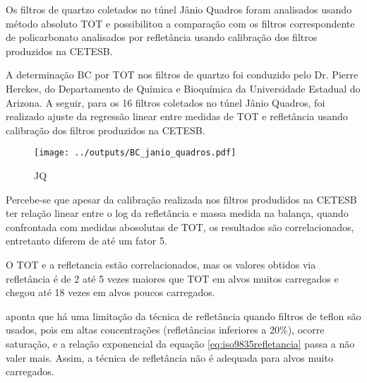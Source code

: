 Os filtros de quartzo coletados no túnel Jânio Quadros foram analisados usando
método absoluto TOT e possibilitou a comparação com os filtros correspondente 
de policarbonato analisados por refletância usando calibração dos filtros
produzidos na CETESB. 

A determinação BC por TOT nos filtros de quartzo foi conduzido pelo 
Dr. Pierre Herckes, do Departamento de Química e Bioquímica da 
Universidade Estadual do Arizona. A seguir, para os 16 filtros coletados no 
túnel Jânio Quadros, foi realizado ajuste da regressão linear
entre medidas de TOT e refletância usando calibração dos filtros produzidos na 
CETESB.

\begin{figure}
  \centering
  \begin{minipage}[b]{0.5\linewidth}
    \texttt{[image: ../outputs/BC\_janio\_quadros.pdf]}
    \caption{JQ}
  \end{minipage}%
  \hspace{0.5cm}
  \begin{minipage}[b]{0.45\linewidth}
    \begin{small}
      
    \end{small}
  \end{minipage}
\end{figure}

Percebe-se que apesar da calibração realizada nos filtros produdidos na CETESB
ter relação linear entre o log da refletância e massa medida na balança, quando
confrontada com medidas abosolutas de TOT, os resultados são correlacionados, 
entretanto diferem de até um fator 5. 

O TOT e a refletancia estão correlacionados, mas os valores obtidos via 
refletância é de 2 até 5 vezes maiores que TOT em alvos muitos carregados e 
chegou até 18 vezes em alvos poucos carregados.

\citet{taha2007} aponta que há uma limitação da técnica de refletância quando 
filtros de teflon são usados, pois em altas concentrações (refletâncias
inferiores a 20\%), ocorre saturação, e a relação exponencial da equação 
\ref{eq:iso9835refletancia} passa a não valer mais. Assim, a técnica de
refletância não é adequada para alvos muito carregados.

